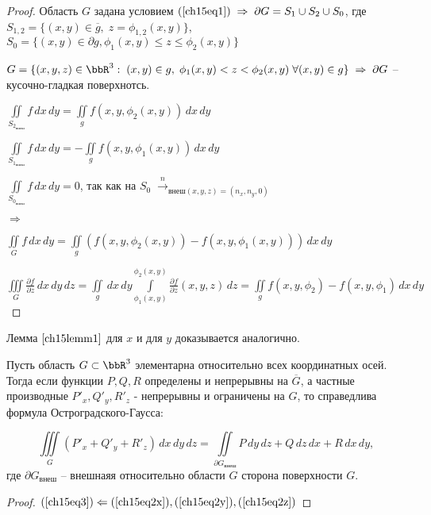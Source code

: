 \begin{proof}
Область $G$ задана условием $(\ref{ch15eq1}) \; \Rightarrow \; \partial G = S_1 \cup S_2 \cup S_0$, 
где $S_{1,2} = \{ (x,y) \in \overline{g}, \; z = \phi_{1,2}(x,y) \}$, $S_0 = \{ (x,y) \in \partial g, \phi_1(x,y) \le z \le \phi_2(x,y) \}$ 

$G = \{ (x,y,z) \in \bbR^3: \; (x,y) \in g, \; \phi_1(x,y) < z < \phi_2(x,y) \; \forall (x,y) \in g \} \; \Rightarrow \; \partial G$ -- кусочно-гладкая поверхнотсь.

$\iint\limits_{S_{2_{\textit{внеш}}}} f \,dx\,dy = \iint\limits_g f(x,y,\phi_2(x,y)) \,dx\,dy$

$\iint\limits_{S_{1_{\textit{внеш}}}} f \,dx\,dy = - \iint\limits_g f(x,y,\phi_1(x,y)) \,dx\,dy$

$\iint\limits_{S_{0_{\textit{внеш}}}} f \,dx\,dy = 0$, так как на $S_0 \; \overset{n}{\to}_{\textit{внеш}(x,y,z) = (n_x, n_y, 0)}$

$\Rightarrow$

$\iint\limits_G f \,dx\,dy = \iint\limits_g (f(x,y,\phi_2(x,y)) - f(x,y,\phi_1(x,y))) \,dx \,dy$

$\iiint\limits_G \frac{\partial f}{\partial z} \,dx \,dy \,dz = \iint\limits_g \,dx \,dy \int\limits_{\phi_1(x,y)}^{\phi_2(x,y)} \frac{\partial f}{\partial z}(x,y,z) \,dz = \iint\limits_g f(x,y,\phi_2) - f(x,y,\phi_1) \,dx \,dy$

\end{proof}

\begin{cons}
Лемма $\ref{ch15lemm1}$ для $x$ и для $y$ доказывается аналогично.
\end{cons}

\begin{thm} 
Пусть область $G \subset \bbR^3$ элементарна относительно всех координатных осей. Тогда если функции $P,Q,R$ определены и непрерывны на $\overline{G}$, а частные производные $P'_x, Q'_y, R'_z$ - непрерывны и ограничены на $G$, то справедлива формула Остроградского-Гаусса:

\begin{equation} \label{ch15eq3}
\iiint\limits_G (P'_x + Q'_y + R'_z) \,dx\,dy\,dz = \iint\limits_{\partial G_{\textit{внеш}}} P\,dy\,dz + Q\,dz\,dx + R\,dx\,dy,
\end{equation}
где $\partial G_{\textit{внеш}}$ -- внешнаяя относительно области $G$ сторона поверхности $G$.

\end{thm}
\begin{proof}
$(\ref{ch15eq3}) \Leftarrow (\ref{ch15eq2x}), (\ref{ch15eq2y}), (\ref{ch15eq2z})$
\end{proof}

